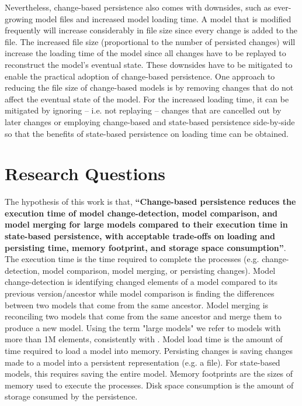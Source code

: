 \documentclass[12pt, a4paper]{report} \usepackage[titletoc]{appendix}
\begin{document}
Nevertheless, change-based persistence also comes with downsides, such as ever-growing model files and increased model loading time. A model that is modified frequently will increase considerably in file size since every change is added to the file. The increased file size (proportional to the number of persisted changes) will increase the loading time of the model since all changes have to be replayed to reconstruct the model's eventual state. These downsides have to be mitigated to enable the practical adoption of change-based persistence. One approach to reducing the file size of change-based models is by removing changes that do not affect the eventual state of the model. For the increased loading time, it can be mitigated by ignoring -- i.e. not replaying -- changes that are cancelled out by later changes or employing change-based and state-based persistence side-by-side so that the benefits of state-based persistence on loading time can be obtained.   

\section{Research Questions}
\label{sec:research_questions}
The hypothesis of this work is that, \textbf{``Change-based persistence reduces the execution time of model change-detection, model comparison, and model merging for large models compared to their execution time in state-based persistence, with acceptable trade-offs on loading and persisting time, memory footprint, and storage space consumption''}. The execution time is the time required to complete the processes (e.g. change-detection, model comparison, model merging, or persisting changes). Model change-detection is identifying changed elements of a model compared to its previous version/ancestor while model comparison is finding the differences between two models that come from the same ancestor. Model merging is reconciling two models that come from the same ancestor and merge them to produce a new model. Using the term "large models" we refer to models with more than 1M elements, consistently with \cite{daniel2016neoemf,pagan2011morsa}. Model load time is the amount of time required to load a model into memory. Persisting changes is saving changes made to a model into a persistent representation (e.g. a file). For state-based models, this requires saving the entire model. Memory footprints are the sizes of memory used to execute the processes. Disk space consumption is the amount of storage consumed by the persistence.  
\end{document}
